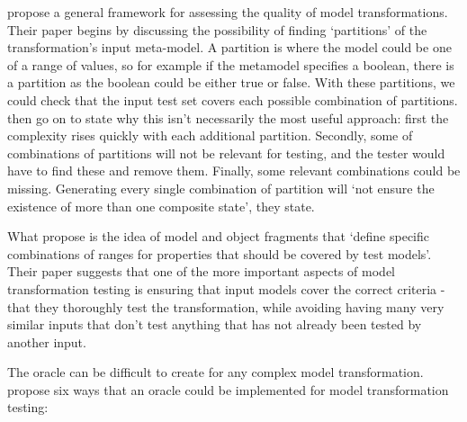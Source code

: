 \citet{fleureyMTInputs} propose a general framework for assessing the quality of model transformations. Their paper begins by discussing the possibility of finding `partitions' of the transformation's input meta-model. A partition is where the model could be one of a range of values, so for example if the metamodel specifies a boolean, there is a partition as the boolean could be either true or false. With these partitions, we could check that the input test set covers each possible combination of partitions. \citet{fleureyMTInputs} then go on to state why this isn't necessarily the most useful approach: first the complexity rises quickly with each additional partition. Secondly, some of combinations of partitions will not be relevant for testing, and the tester would have to find these and remove them. Finally, some relevant combinations could be missing. Generating every single combination of partition will `not ensure the existence of more than one composite state', they state.

What \citet{fleureyMTInputs} propose is the idea of model and object fragments that `define specific combinations of ranges for properties that should be covered by test models'. Their paper suggests that one of the more important aspects of model transformation testing is ensuring that input models cover the correct criteria - that they thoroughly test the transformation, while avoiding having many very similar inputs that don't test anything that has not already been tested by another input.

The oracle can be difficult to create for any complex model transformation. \citet{mttOracleIssue} propose six ways that an oracle could be implemented for model transformation testing:

